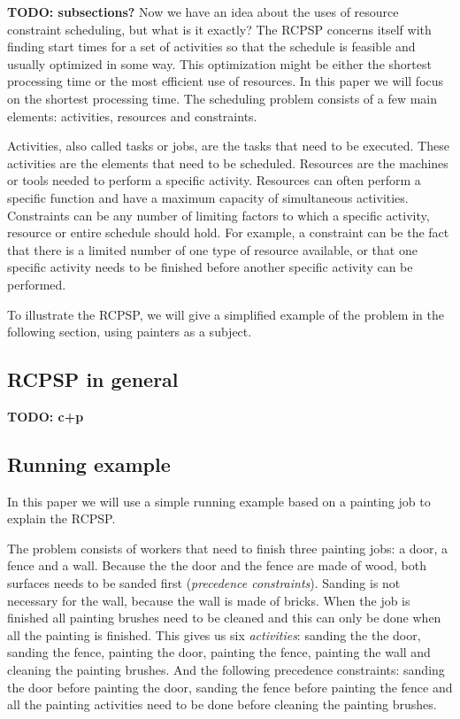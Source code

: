 \documentclass{article}
\theoremstyle{definition}
\newcommand{\TODO}[1]{{\color{red}\textbf{TODO: #1}}}
\begin{document}
\TODO{subsections?}
Now we have an idea about the uses of resource constraint scheduling, but what is it exactly?
The RCPSP concerns itself with finding start times for a set of activities so that the schedule is feasible and usually optimized in some way.
This optimization might be either the shortest processing time or the most efficient use of resources.
In this paper we will focus on the shortest processing time.
The scheduling problem consists of a few main elements: activities, resources and constraints.

Activities, also called tasks or jobs, are the tasks that need to be executed.
These activities are the elements that need to be scheduled.
Resources are the machines or tools needed to perform a specific activity.
Resources can often perform a specific function and have a maximum capacity of simultaneous activities.
Constraints can be any number of limiting factors to which a specific activity, resource or entire schedule should hold.
For example, a constraint can be the fact that there is a limited number of one type of resource available, or that one specific activity needs to be finished before another specific activity can be performed.

To illustrate the RCPSP, we will give a simplified example of the problem in the following section, using painters as a subject.

\subsection{RCPSP in general}

\TODO{c+p}

\subsection{Running example}
In this paper we will use a simple running example based on a painting job to explain the RCPSP.

The problem consists of workers that need to finish three painting jobs: a door, a fence and a wall.
Because the the door and the fence are made of wood, both surfaces needs to be sanded first (\emph{precedence constraints}).
Sanding is not necessary for the wall, because the wall is made of bricks.
When the job is finished all painting brushes need to be cleaned and this can only be done when all the painting is finished.
This gives us six \emph{activities}: sanding the the door, sanding the fence,  painting the door, painting the fence, painting the wall and cleaning the painting brushes.
And the following precedence constraints: sanding the door before painting the door, sanding the fence before painting the fence and all the painting activities need to be done before cleaning the painting brushes.
\end{document}
